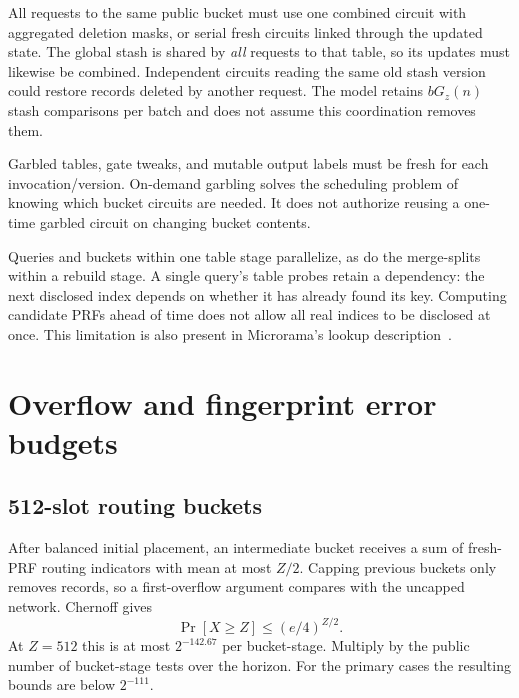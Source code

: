 \documentclass[11pt]{article}
\begin{document}
All requests to the same public bucket must use one combined circuit with
aggregated deletion masks, or serial fresh circuits linked through the
updated state. The global stash is shared by \emph{all} requests to that
table, so its updates must likewise be combined. Independent circuits
reading the same old stash version could restore records deleted by another
request. The model retains $bG_z(n)$ stash comparisons per batch and does
not assume this coordination removes them.

Garbled tables, gate tweaks, and mutable output labels must be fresh for
each invocation/version. On-demand garbling solves the scheduling problem
of knowing which bucket circuits are needed. It does not authorize
reusing a one-time garbled circuit on changing bucket contents.

Queries and buckets within one table stage parallelize, as do the
merge-splits within a rebuild stage. A single query's table probes retain
a dependency: the next disclosed index depends on whether it has already
found its key. Computing candidate PRFs ahead of time does not allow all
real indices to be disclosed at once. This limitation is also present in
Microrama's lookup description~\cite{microrama}.

\section{Overflow and fingerprint error budgets}\label{sec:failure}
\subsection{512-slot routing buckets}
After balanced initial placement, an intermediate bucket receives a sum
of fresh-PRF routing indicators with mean at most $Z/2$. Capping previous
buckets only removes records, so a first-overflow argument compares with
the uncapped network. Chernoff gives
\begin{equation}
 \Pr[X\ge Z]\le(e/4)^{Z/2}.
\end{equation}
At $Z=512$ this is at most $2^{-142.67}$ per bucket-stage. Multiply by
the public number of bucket-stage tests over the horizon. For the primary
cases the resulting bounds are below $2^{-111}$.
\end{document}
